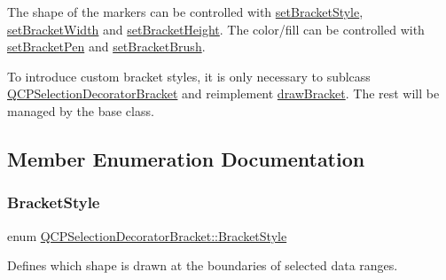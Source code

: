 The shape of the markers can be controlled with \hyperlink{classQCPSelectionDecoratorBracket_a04507697438f6ad8cc2aeea5422dcbe5}{set\+Bracket\+Style}, \hyperlink{classQCPSelectionDecoratorBracket_a291b59cab98ce93a0a3c85963fe10f5e}{set\+Bracket\+Width} and \hyperlink{classQCPSelectionDecoratorBracket_aed773ad737201cca40efc6fe451acad8}{set\+Bracket\+Height}. The color/fill can be controlled with \hyperlink{classQCPSelectionDecoratorBracket_ac0e392a6097990f8aa978932a8fa05d6}{set\+Bracket\+Pen} and \hyperlink{classQCPSelectionDecoratorBracket_a2f4ea0bfb0ea980252b76dd349dd53aa}{set\+Bracket\+Brush}.

To introduce custom bracket styles, it is only necessary to sublcass \hyperlink{classQCPSelectionDecoratorBracket}{Q\+C\+P\+Selection\+Decorator\+Bracket} and reimplement \hyperlink{classQCPSelectionDecoratorBracket_a57b65b5508d5bd0f27c9318f3d4646be}{draw\+Bracket}. The rest will be managed by the base class. 

\subsection{Member Enumeration Documentation}
\mbox{\label{classQCPSelectionDecoratorBracket_aa6d18517ec0553575bbef0de4252336e}} 
\subsubsection{\texorpdfstring{Bracket\+Style}{BracketStyle}}
{\footnotesize\ttfamily enum \hyperlink{classQCPSelectionDecoratorBracket_aa6d18517ec0553575bbef0de4252336e}{Q\+C\+P\+Selection\+Decorator\+Bracket\+::\+Bracket\+Style}}

Defines which shape is drawn at the boundaries of selected data ranges.

